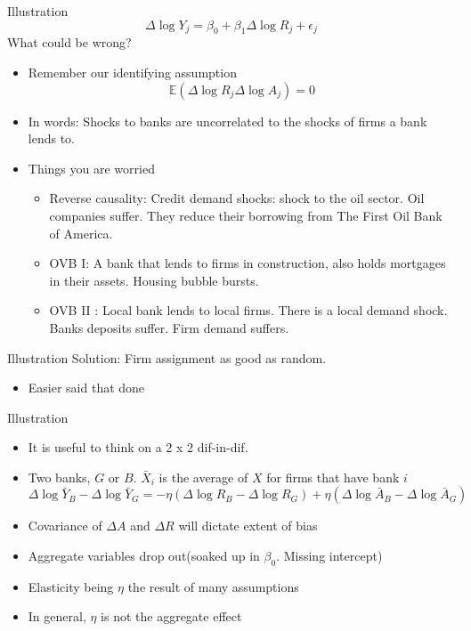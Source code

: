 \documentclass[english,xcolor=svgnames]{beamer}
\begin{document}
\begin{frame}{Illustration}
$$\Delta \log Y_j = \beta_0 + \beta_1 \Delta \log R_j  + \epsilon_j $$
What could be wrong?
\begin{itemize}
\item Remember our identifying assumption
$$\mathbb{E}(\Delta \log R_j \Delta \log A_j) = 0$$
\item In words: Shocks to banks are uncorrelated to the shocks of firms a bank lends to.
\item Things you are worried
\begin{itemize}
\item Reverse causality: Credit demand shocks: shock to the oil sector. Oil companies suffer. They reduce their borrowing from The First Oil Bank of America.
\item OVB I: A bank that lends to firms in construction, also holds mortgages in their assets. Housing bubble bursts.
\item OVB II : Local bank lends to local firms. There is a local demand shock. Banks deposits suffer. Firm demand suffers.
\end{itemize}
\end{itemize}
\end{frame}

\begin{frame}{Illustration}
Solution: Firm assignment as good as random.
\begin{itemize}
\item  Easier said that done
\end{itemize}
\end{frame}

\begin{frame}{Illustration}
\begin{itemize}
\item It is useful to think on a 2 x 2 dif-in-dif.
\item  Two banks, $G$ or $B$. $\bar{X}_i$ is the average of $X$ for firms that have bank $i$
$$\Delta \log \bar{Y}_B -\Delta  \log \bar{Y}_G = -\eta \left( \Delta  \log R_B - \Delta  \log R_G\right)  + \eta\left( \Delta \log \bar{A}_B - \Delta \log \bar{A}_G\right)$$
\item Covariance of $\Delta A$ and $\Delta R$ will dictate extent of bias
\item Aggregate variables drop out(soaked up in $\beta_0$. Missing intercept)
\item Elasticity being $\eta$ the result of many assumptions
\item In general, $\eta$ is not the aggregate effect
\end{itemize}
\end{frame}
\end{document}
